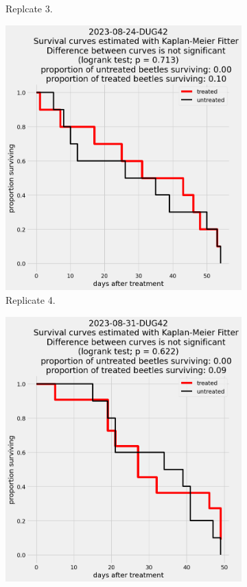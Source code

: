 \documentclass[12pt,letterpaper,english,bibliography=totocnumbered, abstract=on]{scrartcl}
\begin{document}
\begin{figure}[h]
\begin{subfigure}{.3\textwidth}
		\caption{Replcate 3.}
	\end{subfigure}
	\begin{subfigure}{.3\textwidth}
		\includegraphics[width=\textwidth]{images/survival_curves/2023-08-24-DUG42}
		\caption{Replicate 4.}
	\end{subfigure}
	\begin{subfigure}{.3\textwidth}
		\includegraphics[width=\textwidth]{images/survival_curves/2023-08-31-DUG42}

\end{subfigure}
\end{figure}
\end{document}

